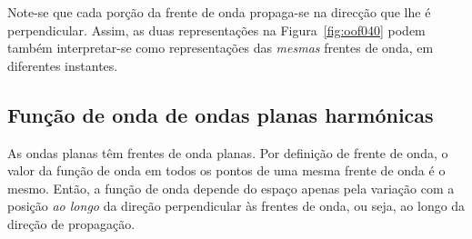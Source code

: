 Note-se que cada porção da frente de onda propaga-se na direcção que lhe é
perpendicular. Assim, as duas representações na Figura~\ref{fig:oof040} podem
também interpretar-se como representações das \emph{mesmas} frentes de onda, em
diferentes instantes.

\subsection{Função de onda de ondas planas harmónicas}
As ondas planas têm frentes de onda planas. Por definição de frente de onda, o
valor da função de onda em todos os pontos de uma mesma frente de onda é
o mesmo. Então, a função de onda depende do espaço apenas pela variação com a
posição \emph{ao longo} da direção perpendicular às frentes de onda, ou seja, ao
longo da direção de propagação.

